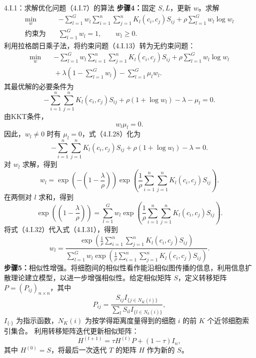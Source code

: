 \begin{bookalgorithm}{4.I.1：求解优化问题（4.I.7）的算法}
\textbf{步骤4：}固定 $S,L$，更新 $w$。求解
\begin{equation}
\begin{aligned}
\min_w\quad
 &-\sum_{l=1}^{G}w_l\sum_{i=1}^{n}\sum_{j=1}^{n}K_l(c_i,c_j)S_{ij}
 +\rho\sum_{l=1}^{G}w_l\log w_l\\
\text{约束为}\quad&\sum_{l=1}^{G}w_l=1,\qquad w_l\ge0.
\end{aligned}\tag{4.I.26}
\end{equation}
利用拉格朗日乘子法，将约束问题（4.I.13）转为无约束问题：
\begin{equation}
\begin{aligned}
\min_w\quad
 &-\sum_{l=1}^{G}w_l\sum_{i=1}^{n}\sum_{j=1}^{n}K_l(c_i,c_j)S_{ij}
 +\rho\sum_{l=1}^{G}w_l\log w_l\\
 &{}+\lambda\left(1-\sum_{l=1}^{G}w_l\right)-\sum_{l=1}^{G}\mu_lw_l.
\end{aligned}\tag{4.I.27}
\end{equation}
其最优解的必要条件为
\begin{equation}
-\sum_{i=1}^{n}\sum_{j=1}^{n}K_l(c_i,c_j)S_{ij}
+\rho(1+\log w_l)-\lambda-\mu_l=0.\tag{4.I.28}
\end{equation}
由KKT条件，
\begin{equation}
w_l\mu_l=0.\tag{4.I.29}
\end{equation}
因此，$w_l\ne0$ 时有 $\mu_l=0$，式（4.I.28）化为
\begin{equation}
-\sum_{i=1}^{n}\sum_{j=1}^{n}K_l(c_i,c_j)S_{ij}
+\rho(1+\log w_l)-\lambda=0.\tag{4.I.30}
\end{equation}
对 $w_l$ 求解，得到
\begin{equation}
w_l=\exp\left(-\left(1-\frac\lambda\rho\right)\right)
\exp\left(\frac1\rho\sum_{i=1}^{n}\sum_{j=1}^{n}K_l(c_i,c_j)S_{ij}\right).\tag{4.I.31}
\end{equation}
在两侧对 $l$ 求和，得到
\begin{equation}
\exp\left(\left(1-\frac\lambda\rho\right)\right)
=\sum_{l=1}^{G}w_l
\exp\left(\frac1\rho\sum_{i=1}^{n}\sum_{j=1}^{n}K_l(c_i,c_j)S_{ij}\right).\tag{4.I.32}
\end{equation}
将式（4.I.32）代入式（4.I.31），得到
\[
w_l=\frac{
\exp\left(\frac1\rho\sum_{i=1}^{n}\sum_{j=1}^{n}K_l(c_i,c_j)S_{ij}\right)}{
\sum_{l=1}^{G}w_l\exp\left(\frac1\rho\sum_{i=1}^{n}\sum_{j=1}^{n}K_l(c_i,c_j)S_{ij}\right)}.
\]
\textbf{步骤5：}相似性增强。将细胞间的相似性看作能沿相似图传播的信息，利用信息扩散理论建立模型，以进一步增强相似性。给定相似矩阵 $S$，定义转移矩阵 $P=(P_{ij})_{n\times n}$，其中
\begin{equation}
P_{ij}=\frac{S_{ij}I_{\{j\in N_K(i)\}}}{\sum_lS_{il}I_{\{l\in N_k(i)\}}},\tag{4.I.33}
\end{equation}
$I_{\{\cdot\}}$ 为指示函数，$N_K(i)$ 为按学得距离度量得到的细胞 $i$ 的前 $K$ 个近邻细胞索引集合。
利用转移矩阵迭代更新相似矩阵：
\begin{equation}
H^{(t+1)}=\tau H^{(t)}P+(1-\tau)I_n,\tag{4.I.34}
\end{equation}
其中 $H^{(0)}=S$，将最后一次迭代 $T$ 的矩阵 $H$ 作为新的 $S$。


\end{bookalgorithm}
